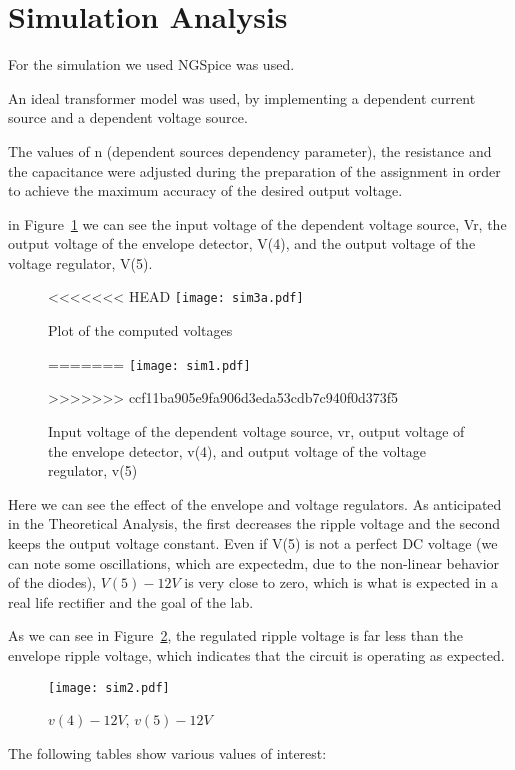 \section{Simulation Analysis}
\label{sec:simulation}

For the simulation we used NGSpice was used.

An ideal transformer model was used, by implementing a dependent current source and a dependent voltage source. 

The values of n (dependent sources dependency parameter), the resistance and the capacitance were adjusted during the preparation of the assignment in order to achieve
the maximum accuracy of the desired output voltage.

in Figure~\ref{fig:sim3a} we can see the input voltage of the dependent voltage source, Vr, the output voltage of the envelope detector, V(4), and the output voltage of the voltage regulator, V(5).


\begin{figure}[h] \centering
<<<<<<< HEAD
\texttt{[image: sim3a.pdf]}
	\caption{Plot of the computed voltages}
=======
\texttt{[image: sim1.pdf]}
	\caption{Input voltage of the dependent voltage source, vr, output voltage of the envelope detector, v(4), and output voltage of the voltage regulator, v(5)}
>>>>>>> ccf11ba905e9fa906d3eda53cdb7c940f0d373f5
\label{fig:sim3a}
\end{figure}


Here we can see the effect of the envelope and voltage regulators. As anticipated in the Theoretical Analysis, the first decreases the ripple voltage and 
the second keeps the output voltage constant. Even if V(5) is not a perfect DC voltage (we can note some oscillations, which are expectedm, due to the non-linear behavior of the diodes), $V(5) - 12V$ is 
very close to zero, which is what is expected in a real life rectifier and the goal of the lab. 

As we can see in Figure~\ref{fig:sim3b}, the regulated ripple voltage is far less than the envelope ripple voltage, which indicates that the circuit is operating as expected. 

\begin{figure}[h] \centering
\texttt{[image: sim2.pdf]}
	\caption{$v(4)-12V$, $v(5)-12V$}                        
\label{fig:sim3b} 
\end{figure}

The following tables show various values of interest:


